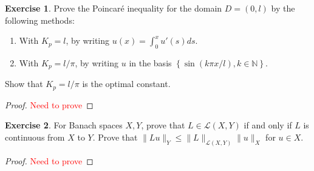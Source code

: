 \documentclass{amsart}
\theoremstyle{plain}
\theoremstyle{definition}
\newtheorem{exer}{Exercise}[section]
\newcommand{\N}{\mathbb{N}}
\newcommand{\tcr}[1]{\textcolor{red}{#1}}
\begin{document}
\begin{exer}
Prove the Poincaré inequality for the domain $D =(0, l)$ by the following methods:
    \begin{enumerate}[label=\alph*.]
        \item With $K_p = l$, by writing $u(x) = \int_{0}^{x} u'(s) ds.$
        \item With $K_p = l/\pi$, by writing $u$ in the basis $\left\{\sin\left(k\pi x/l\right), k\in \N\right\}.$
    \end{enumerate}
    Show that $K_p = l/\pi$ is the optimal constant. 
\end{exer}
\begin{proof}
    \tcr{Need to prove}
\end{proof}

\begin{exer}
    For Banach spaces $X,Y$, prove that $L \in \mathcal{L}(X,Y)$ if and only if $L$ is continuous from $X$ to $Y$. Prove that $\|Lu\|_{Y} \leq \|L\|_{\mathcal{L}(X,Y)} \|u\|_{X}$ for $u\in X$.
\end{exer}
\begin{proof}
\tcr{Need to prove}
    
\end{proof}

\printbibliography
\end{document}
